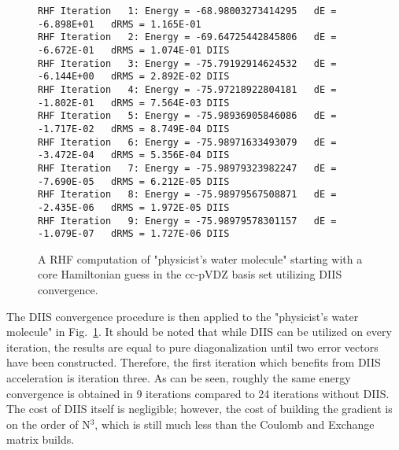 \documentclass[aip,jcp,preprint,superscriptaddress,floatfix]{revtex4-1}
\begin{document}
\begin{figure}[htbp]
\begin{center}
\caption{A RHF computation of "physicist's water molecule" starting with a core Hamiltonian guess in the cc-pVDZ basis set utilizing DIIS convergence.}
\label{rhf_water_diis}
{\footnotesize\linespread{1}\normalfont\ttfamily
\begin{verbatim}
RHF Iteration   1: Energy = -68.98003273414295   dE = -6.898E+01   dRMS = 1.165E-01
RHF Iteration   2: Energy = -69.64725442845806   dE = -6.672E-01   dRMS = 1.074E-01 DIIS
RHF Iteration   3: Energy = -75.79192914624532   dE = -6.144E+00   dRMS = 2.892E-02 DIIS
RHF Iteration   4: Energy = -75.97218922804181   dE = -1.802E-01   dRMS = 7.564E-03 DIIS
RHF Iteration   5: Energy = -75.98936905846086   dE = -1.717E-02   dRMS = 8.749E-04 DIIS
RHF Iteration   6: Energy = -75.98971633493079   dE = -3.472E-04   dRMS = 5.356E-04 DIIS
RHF Iteration   7: Energy = -75.98979323982247   dE = -7.690E-05   dRMS = 6.212E-05 DIIS
RHF Iteration   8: Energy = -75.98979567508871   dE = -2.435E-06   dRMS = 1.972E-05 DIIS
RHF Iteration   9: Energy = -75.98979578301157   dE = -1.079E-07   dRMS = 1.727E-06 DIIS
\end{verbatim}
}
\end{center}
\end{figure}
The DIIS convergence procedure is then applied to the "physicist's water molecule" in Fig.~\ref{rhf_water_diis}.
It should be noted that while DIIS can be utilized on every iteration, the results are equal to pure diagonalization until two error vectors have been constructed.
Therefore, the first iteration which benefits from DIIS acceleration is iteration three. 
As can be seen, roughly the same energy convergence is obtained in 9 iterations compared to 24 iterations without DIIS.
The cost of DIIS itself is negligible; however, the cost of building the gradient is on the order of N$^3$, which is still much less than the Coulomb and Exchange matrix builds.




\end{document}
